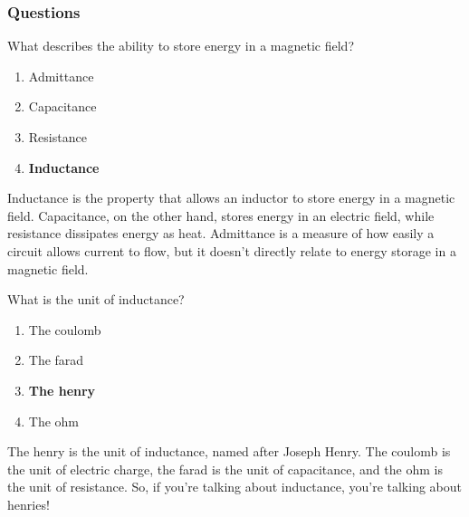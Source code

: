 \subsubsection{Questions}

\begin{tcolorbox}[colback=gray!10!white,colframe=black!75!black,title={T5C03}]
    What describes the ability to store energy in a magnetic field?
    \begin{enumerate}[label=\Alph*),noitemsep]
        \item Admittance
        \item Capacitance
        \item Resistance
        \item \textbf{Inductance}
    \end{enumerate}
\end{tcolorbox}

Inductance is the property that allows an inductor to store energy in a magnetic field. Capacitance, on the other hand, stores energy in an electric field, while resistance dissipates energy as heat. Admittance is a measure of how easily a circuit allows current to flow, but it doesn't directly relate to energy storage in a magnetic field.

\begin{tcolorbox}[colback=gray!10!white,colframe=black!75!black,title={T5C04}]
    What is the unit of inductance?
    \begin{enumerate}[label=\Alph*),noitemsep]
        \item The coulomb
        \item The farad
        \item \textbf{The henry}
        \item The ohm
    \end{enumerate}
\end{tcolorbox}

The henry is the unit of inductance, named after Joseph Henry. The coulomb is the unit of electric charge, the farad is the unit of capacitance, and the ohm is the unit of resistance. So, if you're talking about inductance, you're talking about henries!

